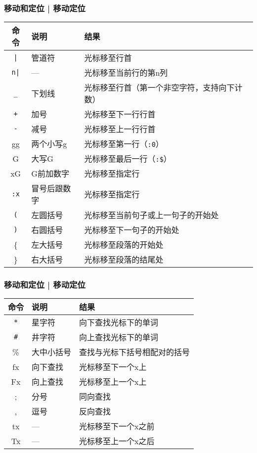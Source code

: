 \begin{frame}[fragile]
  \frametitle{移动和定位 | \alert{移动定位}}
  \begin{table}
    \centering
    \begin{tabularx}{\textwidth}{clX}
      \hline
      \rowcolor{blue!50}命令 & 说明 & 结果\\
      \hline
      \verb=|= & 管道符 & 光标移至行首\\
      \verb=n|= & --- & 光标移至当前行的第n列\\
      \verb|_| & 下划线 & 光标移至行首\small{（第一个非空字符，支持向下计数）}\\
      \hline
      \verb|+| & 加号 & 光标移至下一行行首\\
      \verb|-| & 减号 & 光标移至上一行行首\\
      \hline
      gg & 两个小写g & 光标移至第一行（\verb|:0|）\\
      G & 大写G & 光标移至最后一行（\verb|:$|）\\
      xG & G前加数字 & 光标移至指定行\\
      \verb|:x| & 冒号后跟数字 & 光标移至指定行\\
      \hline
      \verb|(| & 左圆括号 & 光标移至当前句子或上一句子的开始处\\
      \verb|)| & 右圆括号 & 光标移至下一句子的开始处\\
      \hline
      \{ & 左大括号 & 光标移至段落的开始处\\
      \} & 右大括号 & 光标移至段落的结尾处\\
      \hline
    \end{tabularx}
  \end{table}
\end{frame}

\begin{frame}[fragile]
  \frametitle{移动和定位 | \alert{移动定位}}
  \begin{table}
    \centering
    \begin{tabularx}{0.8\textwidth}{clX}
      \hline
      \rowcolor{blue!50}命令 & 说明 & 结果\\
      \hline
      \verb|*| & 星字符 & 向下查找光标下的单词\\
      \verb|#| & 井字符 & 向上查找光标下的单词\\
      \hline
      \% & 大中小括号 & 查找与光标下括号相配对的括号\\
      \hline
      fx & 向下查找 & 光标移至下一个x上\\
      Fx & 向上查找 & 光标移至上一个x上\\
      ; & 分号 & 同向查找\\
      , & 逗号 & 反向查找\\
      \hline
      tx & --- & 光标移至下一个x之前\\
      Tx & --- & 光标移至上一个x之后\\
      \hline
    \end{tabularx}
  \end{table}
\end{frame}

